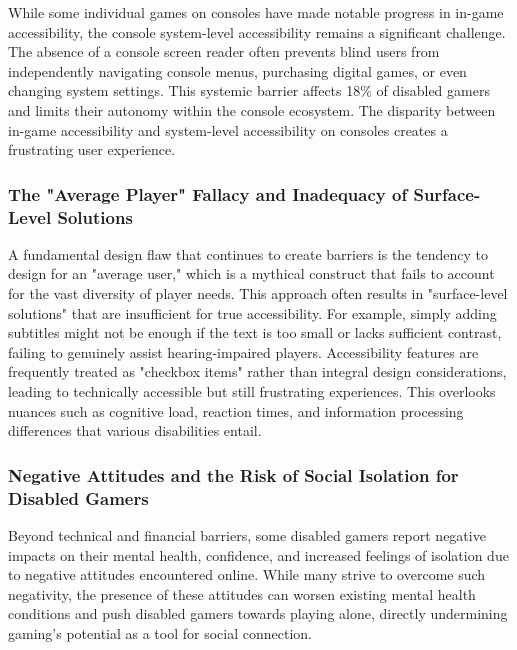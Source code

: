 While some individual games on consoles have made notable progress in in-game accessibility, the console system-level accessibility remains a significant challenge. The absence of a console screen reader often prevents blind users from independently navigating console menus, purchasing digital games, or even changing system settings\supercite{LudaccessList}. This systemic barrier affects 18\% of disabled gamers and limits their autonomy within the console ecosystem\supercite{ScopeGamingReport}. The disparity between in-game accessibility and system-level accessibility on consoles creates a frustrating user experience.

\subsubsection{The "Average Player" Fallacy and Inadequacy of Surface-Level Solutions}

A fundamental design flaw that continues to create barriers is the tendency to design for an "average user," which is a mythical construct that fails to account for the vast diversity of player needs\supercite{Wayline2025}. This approach often results in "surface-level solutions" that are insufficient for true accessibility. For example, simply adding subtitles might not be enough if the text is too small or lacks sufficient contrast, failing to genuinely assist hearing-impaired players\supercite{Wayline2025}. Accessibility features are frequently treated as "checkbox items" rather than integral design considerations, leading to technically accessible but still frustrating experiences. This overlooks nuances such as cognitive load, reaction times, and information processing differences that various disabilities entail\supercite{Wayline2025}.

\subsubsection{Negative Attitudes and the Risk of Social Isolation for Disabled Gamers}

Beyond technical and financial barriers, some disabled gamers report negative impacts on their mental health, confidence, and increased feelings of isolation due to negative attitudes encountered online\supercite{ScopeGamingReport}. While many strive to overcome such negativity, the presence of these attitudes can worsen existing mental health conditions and push disabled gamers towards playing alone, directly undermining gaming's potential as a tool for social connection\supercite{ScopeGamingReport}.

